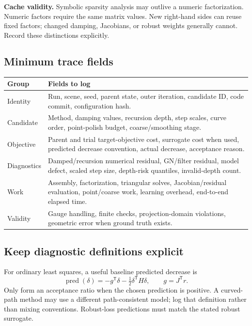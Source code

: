 \documentclass[11pt,a4paper]{article}
\begin{document}
\textbf{Cache validity.} Symbolic sparsity analysis may outlive a numeric factorization. Numeric factors require the same matrix values. New right-hand sides can reuse fixed factors; changed damping, Jacobians, or robust weights generally cannot. Record these distinctions explicitly.

\subsection*{Minimum trace fields}
\renewcommand{\arraystretch}{1.13}
\begin{tabularx}{\linewidth}{@{}p{36mm}Y@{}}
\toprule
\textbf{Group} & \textbf{Fields to log}\\
\midrule
Identity & Run, scene, seed, parent state, outer iteration, candidate ID, code commit, configuration hash.\\
Candidate & Method, damping values, recursion depth, step scales, curve order, point-polish budget, coarse/smoothing stage.\\
Objective & Parent and trial target-objective cost, surrogate cost when used, predicted decrease convention, actual decrease, acceptance reason.\\
Diagnostics & Damped/recursion numerical residual, GN/filter residual, model defect, scaled step size, depth-risk quantiles, invalid-depth count.\\
Work & Assembly, factorization, triangular solves, Jacobian/residual evaluation, point/coarse work, learning overhead, end-to-end elapsed time.\\
Validity & Gauge handling, finite checks, projection-domain violations, geometric error when ground truth exists.\\
\bottomrule
\end{tabularx}

\subsection*{Keep diagnostic definitions explicit}
For ordinary least squares, a useful baseline predicted decrease is
\begin{equation}
 \operatorname{pred}(\delta)=-g^{\mathsf T}\delta-\tfrac12\delta^{\mathsf T}H\delta,
 \qquad g=J^{\mathsf T}r.
\end{equation}
Only form an acceptance ratio when the chosen prediction is positive. A curved-path method may use a different path-consistent model; log that definition rather than mixing conventions. Robust-loss predictions must match the stated robust surrogate.
\end{document}
